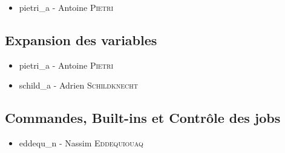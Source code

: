 \begin{itemize}
    \item pietri\_a - Antoine \textsc{Pietri}
\end{itemize}

\subsection{Expansion des variables}

\begin{itemize}
    \item pietri\_a - Antoine \textsc{Pietri}
    \item schild\_a - Adrien \textsc{Schildknecht}
\end{itemize}

\subsection{Commandes, Built-ins et Contrôle des jobs}

\begin{itemize}
    \item eddequ\_n - Nassim \textsc{Eddequiouaq}
\end{itemize}
